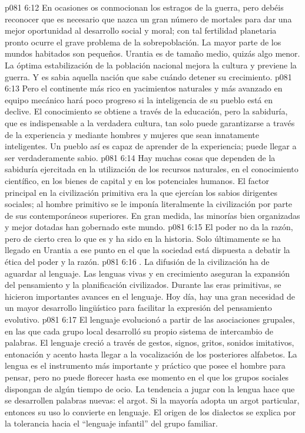 \vs p081 6:12 En ocasiones os conmocionan los estragos de la guerra, pero debéis reconocer que es necesario que nazca un gran número de mortales para dar una mejor oportunidad al desarrollo social y moral; con tal fertilidad planetaria pronto ocurre el grave problema de la sobrepoblación. La mayor parte de los mundos habitados son pequeños. Urantia es de tamaño medio, quizás algo menor. La óptima estabilización de la población nacional mejora la cultura y previene la guerra. Y es sabia aquella nación que sabe cuándo detener su crecimiento.
\vs p081 6:13 Pero el continente más rico en yacimientos naturales y más avanzado en equipo mecánico hará poco progreso si la inteligencia de su pueblo está en declive. El conocimiento se obtiene a través de la educación, pero la sabiduría, que es indispensable a la verdadera cultura, tan solo puede garantizarse a través de la experiencia y mediante hombres y mujeres que sean innatamente inteligentes. Un pueblo así es capaz de aprender de la experiencia; puede llegar a ser verdaderamente sabio.
\vs p081 6:14  Hay muchas cosas que dependen de la sabiduría ejercitada en la utilización de los recursos naturales, en el conocimiento científico, en los bienes de capital y en los potenciales humanos. El factor principal en la civilización primitiva era la  que ejercían los sabios dirigentes sociales; al hombre primitivo se le imponía literalmente la civilización por parte de sus contemporáneos superiores. En gran medida, las minorías bien organizadas y mejor dotadas han gobernado este mundo.
\vs p081 6:15 El poder no da la razón, pero de cierto crea lo que es y ha sido en la historia. Solo últimamente se ha llegado en Urantia a ese punto en el que la sociedad está dispuesta a debatir la ética del poder y la razón.
\vs p081 6:16 . La difusión de la civilización ha de aguardar al lenguaje. Las lenguas vivas y en crecimiento aseguran la expansión del pensamiento y la planificación civilizados. Durante las eras primitivas, se hicieron importantes avances en el lenguaje. Hoy día, hay una gran necesidad de un mayor desarrollo lingüístico para facilitar la expresión del pensamiento evolutivo.
\vs p081 6:17 El lenguaje evolucionó a partir de las asociaciones grupales, en las que cada grupo local desarrolló su propio sistema de intercambio de palabras. El lenguaje creció a través de gestos, signos, gritos, sonidos imitativos, entonación y acento hasta llegar a la vocalización de los posteriores alfabetos. La lengua es el instrumento más importante y práctico que posee el hombre para pensar, pero no puede florecer hasta ese momento en el que los grupos sociales dispongan de algún tiempo de ocio. La tendencia a jugar con la lengua hace que se desarrollen palabras nuevas: el argot. Si la mayoría adopta un argot particular, entonces su uso lo convierte en lenguaje. El origen de los dialectos se explica por la tolerancia hacia el “lenguaje infantil” del grupo familiar.
